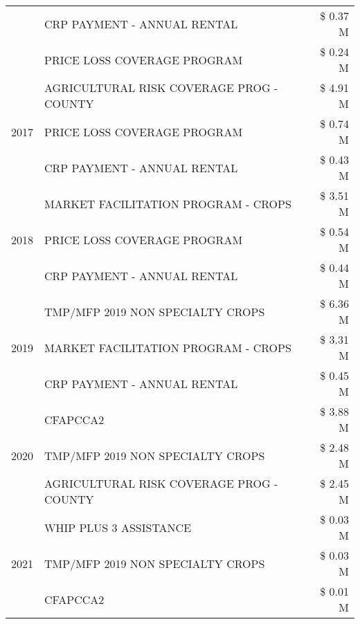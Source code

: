 \begin{tabular}{llr}
 & CRP PAYMENT - ANNUAL RENTAL                   & \$ 0.37 M \\
 & PRICE LOSS COVERAGE PROGRAM                   & \$ 0.24 M \\
\cline{1-3}
\multirow[t]{3}{*}{2017} & AGRICULTURAL RISK COVERAGE PROG - COUNTY & \$ 4.91 M \\
 & PRICE LOSS COVERAGE PROGRAM & \$ 0.74 M \\
 & CRP PAYMENT - ANNUAL RENTAL & \$ 0.43 M \\
\cline{1-3}
\multirow[t]{3}{*}{2018} & MARKET FACILITATION PROGRAM - CROPS & \$ 3.51 M \\
 & PRICE LOSS COVERAGE PROGRAM & \$ 0.54 M \\
 & CRP PAYMENT - ANNUAL RENTAL & \$ 0.44 M \\
\cline{1-3}
\multirow[t]{3}{*}{2019} & TMP/MFP 2019 NON SPECIALTY CROPS & \$ 6.36 M \\
 & MARKET FACILITATION PROGRAM - CROPS & \$ 3.31 M \\
 & CRP PAYMENT - ANNUAL RENTAL & \$ 0.45 M \\
\cline{1-3}
\multirow[t]{3}{*}{2020} & CFAPCCA2 & \$ 3.88 M \\
 & TMP/MFP 2019 NON SPECIALTY CROPS & \$ 2.48 M \\
 & AGRICULTURAL RISK COVERAGE PROG - COUNTY & \$ 2.45 M \\
\cline{1-3}
\multirow[t]{3}{*}{2021} & WHIP PLUS 3 ASSISTANCE & \$ 0.03 M \\
 & TMP/MFP 2019 NON SPECIALTY CROPS & \$ 0.03 M \\
 & CFAPCCA2 & \$ 0.01 M \\
\cline{1-3}
\bottomrule
\end{tabular}
